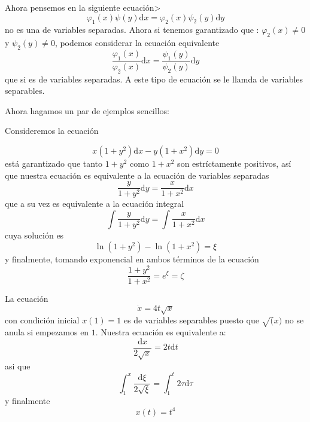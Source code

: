 Ahora pensemos en la siguiente ecuación>
$$
\varphi_1(x)\psi(y)\mathrm{d}x=\varphi_2(x)\psi_2(y)\mathrm{d}y
$$
no es una de variables separadas. Ahora si tenemos garantizado que : $\varphi_2(x)\neq 0$ y $\psi_2(y)\neq 0$, podemos  considerar la ecuación equivalente
$$
\frac{\varphi_1(x)}{\varphi_2(x)}\mathrm{d}x=\frac{\psi_1(y)}{\psi_2(y)}\mathrm{d}y
$$
que si es de variables separadas. A este tipo de ecuación se le llamda de variables separables.

Ahora hagamos un par de ejemplos sencillos:

\begin{exampleT}
Consideremos la ecuación

$$
x(1+y^2)\mathrm{d}x-y(1+x^2)\mathrm{d}y=0
$$
está garantizado que  tanto $1+y^2$ como $1+x^2$ son estríctamente positivos, así que nuestra ecuación es equivalente a la ecuación de variables separadas
$$
\frac{y}{1+y^2}\mathrm{d}y=\frac{x}{1+x^2}\mathrm{d}x
$$
que a su vez es equivalente a la ecuación integral
$$
\int \frac{y}{1+y^2}\mathrm{d}y=\int \frac{x}{1+x^2}\mathrm{d}x
$$
cuya solución es 
$$
\ln(1+y^2)-\ln(1+x^2)=\xi
$$
y finalmente, tomando exponencial en ambos términos de la ecuación
$$
\frac{1+y^2}{1+x^2}=e^{\xi}=\zeta
$$
\end{exampleT}

\begin{exampleT}
La ecuación
$$
\dot{x}=4t\sqrt{x}
$$
con condición inicial $x(1)=1$ es de variables separables puesto que $\sqrt(x)$ no se anula si empezamos en $1$. Nuestra ecuación es equivalente a:
$$
\frac{\mathrm{d}x}{2\sqrt{x}}=2t\mathrm{d}t
$$
asi que
$$
\int_{1}^{x}\frac{\mathrm{d}\xi}{2\sqrt{\xi}}=\int_{1}^{t}2\tau\mathrm{d}\tau
$$
y finalmente
$$
x(t)=t^4
$$
\end{exampleT}